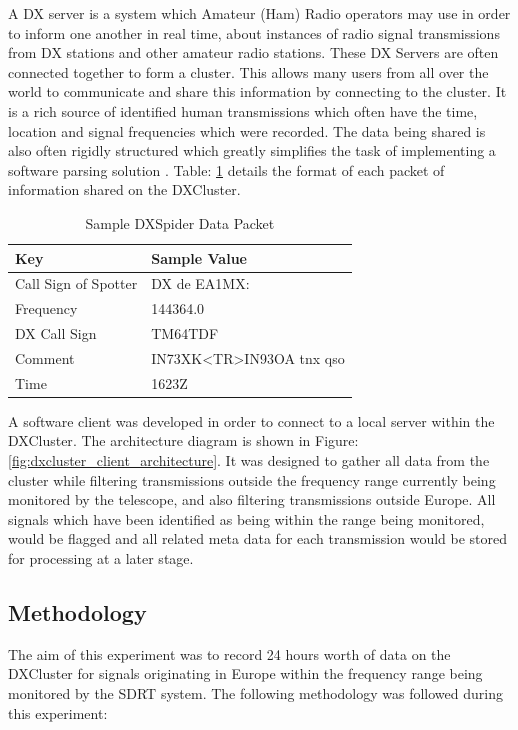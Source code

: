 \documentclass[runningheads,a4paper]{llncs}
\begin{document}
A DX server is a system which Amateur (Ham) Radio operators may use in order to inform one another in real time, about instances of radio signal transmissions from DX stations and other amateur radio stations. These DX Servers are often connected together to form a cluster. This allows many users from all over the world to communicate and share this information by connecting to the cluster. It is a rich source of identified human transmissions which often have the time, location and signal frequencies which were recorded. The data being shared is also often rigidly structured which greatly simplifies the task of implementing a software parsing solution \citep{koopman-07}. Table: \ref{tab:dxspider_data_packet} details the format of each packet of information shared on the DXCluster. 

%
\begin{table}
	\centering
	\begin{tabular}{p{4cm} l}
		\toprule
		Key & Sample Value\\ \midrule
		Call Sign of Spotter & DX de EA1MX: \\
		Frequency & 144364.0 \\
		DX Call Sign & TM64TDF \\
		Comment & IN73XK\textless TR\textgreater IN93OA tnx qso \\
		Time & 1623Z \\
		\bottomrule
	\end{tabular}
	\caption{Sample DXSpider Data Packet}
	\label{tab:dxspider_data_packet}
\end{table}
%
                   

A software client was developed in order to connect to a local server within the \gls{DXCluster}. The architecture diagram is shown in Figure: \ref{fig:dxcluster_client_architecture}. It was designed to gather all data from the cluster while filtering transmissions outside the frequency range currently being monitored by the telescope, and also filtering transmissions outside Europe. All signals which have been identified as being within the range being monitored, would be flagged and all related meta data for each transmission would be stored for processing at a later stage.


\subsection*{Methodology}
The aim of this experiment was to record 24 hours worth of data on the \gls{DXCluster} for signals originating in Europe within the frequency range being monitored by the SDRT system. The following methodology was followed during this experiment:
\end{document}
